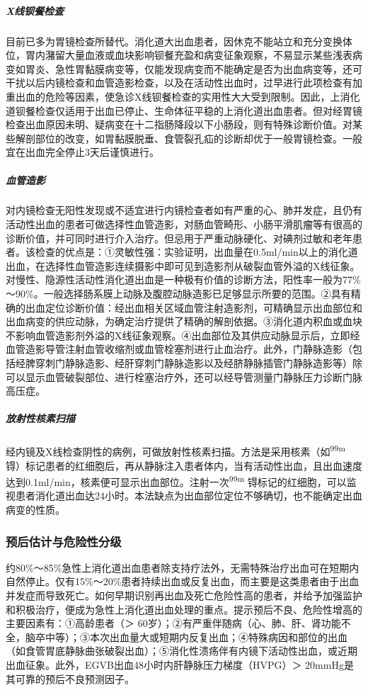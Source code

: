 \subparagraph{X线钡餐检查}

目前已多为胃镜检查所替代。消化道大出血患者，因休克不能站立和充分变换体位，胃内潴留大量血液或血块影响钡餐充盈和病变征象观察，不易显示某些浅表病变如胃炎、急性胃黏膜病变等，仅能发现病变而不能确定是否为出血病变等，还可干扰以后内镜检查和血管造影检查，以及在活动性出血时，过早进行此项检查有加重出血的危险等因素，使急诊X线钡餐检查的实用性大大受到限制。因此，上消化道钡餐检查仅适用于出血已停止、生命体征平稳的上消化道出血患者。但对经胃镜检查出血原因未明、疑病变在十二指肠降段以下小肠段，则有特殊诊断价值。对某些解剖部位的改变，如胃黏膜脱垂、食管裂孔疝的诊断却优于一般胃镜检查。一般宜在出血完全停止3天后谨慎进行。

\subparagraph{血管造影}

对内镜检查无阳性发现或不适宜进行内镜检查者如有严重的心、肺并发症，且仍有活动性出血的患者可做选择性血管造影，对肠血管畸形、小肠平滑肌瘤等有很高的诊断价值，并可同时进行介入治疗。但忌用于严重动脉硬化、对碘剂过敏和老年患者。该检查的优点是：①灵敏性强：实验证明，出血量在0.5ml/min以上的消化道出血，在选择性血管造影连续摄影中即可见到造影剂从破裂血管外溢的X线征象。对慢性、隐源性活动性消化道出血是一种极有价值的诊断方法，阳性率一般为77\%～90\%。一般选择肠系膜上动脉及腹腔动脉造影已足够显示所要的范围。②具有精确的出血定位诊断价值：经出血相关区域血管注射造影剂，可精确显示出血部位和出血病变的供应动脉，为确定治疗提供了精确的解剖依据。③消化道内积血或血块不影响血管造影剂外溢的X线征象观察。④出血部位及其供应动脉显示后，立即经血管造影导管注射血管收缩剂或血管栓塞剂进行止血治疗。此外，门静脉造影（包括经脾穿刺门静脉造影、经肝穿刺门静脉造影以及经脐静脉插管门静脉造影等）除可以显示血管破裂部位、进行栓塞治疗外，还可以经导管测量门静脉压力诊断门脉高压症。

\subparagraph{放射性核素扫描}

经内镜及X线检查阴性的病例，可做放射性核素扫描。方法是采用核素（如\textsuperscript{99m}
锝）标记患者的红细胞后，再从静脉注入患者体内，当有活动性出血，且出血速度达到0.1ml/min，核素便可显示出血部位。注射一次\textsuperscript{99m}
锝标记的红细胞，可以监视患者消化道出血达24小时。本法缺点为出血部位定位不够确切，也不能确定出血病变的性质。

\subsubsection{预后估计与危险性分级}

约80\%～85\%急性上消化道出血患者除支持疗法外，无需特殊治疗出血可在短期内自然停止。仅有15\%～20\%患者持续出血或反复出血，而主要是这类患者由于出血并发症而导致死亡。如何早期识别再出血及死亡危险性高的患者，并给予加强监护和积极治疗，便成为急性上消化道出血处理的重点。提示预后不良、危险性增高的主要因素有：①高龄患者（＞
60岁）；②有严重伴随病（心、肺、肝、肾功能不全，脑卒中等）；③本次出血量大或短期内反复出血；④特殊病因和部位的出血（如食管胃底静脉曲张破裂出血）；⑤消化性溃疡伴有内镜下活动性出血，或近期出血征象。此外，EGVB出血48小时内肝静脉压力梯度（HVPG）＞
20mmHg是其可靠的预后不良预测因子。


